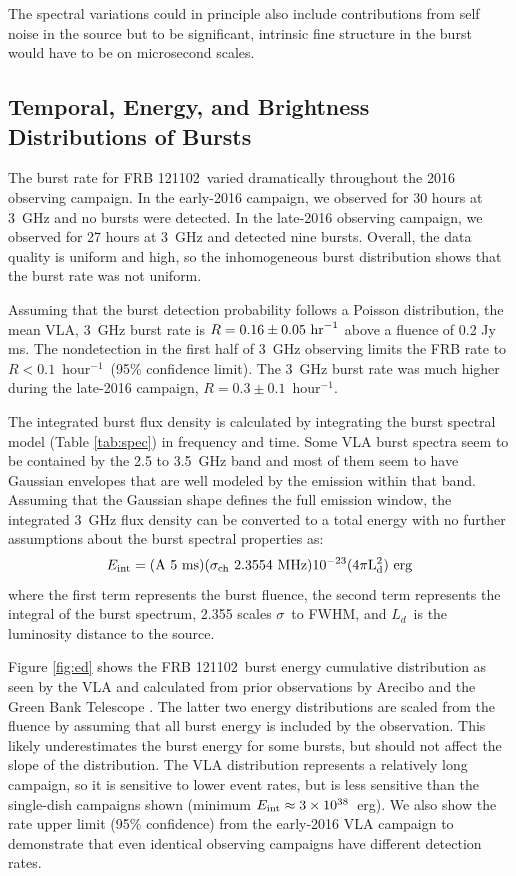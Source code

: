 \documentclass[twocolumn]{aastex61}
\newcommand{\frb}{FRB 121102}
\begin{document}
The spectral variations could in principle also include contributions from self noise in the source but to be significant, intrinsic fine structure in the burst would have to be on microsecond scales.  

\subsection{Temporal, Energy, and Brightness Distributions of Bursts}
\label{sec:disn}

The burst rate for \frb\ varied dramatically throughout the 2016 observing campaign. In the early-2016 campaign, we observed for 30 hours at 3~GHz and no bursts were detected. In the late-2016 observing campaign, we observed for 27 hours at 3~GHz and detected nine bursts. Overall, the data quality is uniform and high, so the inhomogeneous burst distribution shows that the burst rate was not uniform.

Assuming that the burst detection probability follows a Poisson distribution, the mean VLA, 3~GHz burst rate is $R=0.16\pm0.05\ \rm{hr}^{-1}$ above a fluence of 0.2 Jy ms. The nondetection in the first half of 3~GHz observing limits the FRB rate to $R<0.1$\ hour$^{-1}$\ (95\% confidence limit). The 3~GHz burst rate was much higher during the late-2016 campaign, $R=0.3\pm0.1$\ hour$^{-1}$.

The integrated burst flux density is calculated by integrating the burst spectral model (Table \ref{tab:spec}) in frequency and time. Some VLA burst spectra seem to be contained by the 2.5 to 3.5~GHz band and most of them seem to have Gaussian envelopes that are well modeled by the emission within that band. Assuming that the Gaussian shape defines the full emission window, the integrated 3~GHz flux density can be converted to a total energy with no further assumptions about the burst spectral properties as:
\begin{equation}
E_{\rm{int}} = (\rm{A}\ 5\ \rm{ms}) ( \sigma_{ch}\ 2.355 4\ \rm{MHz}) 10^{-23} (4\pi L_d^2)\ \rm{erg}
\end{equation}
\noindent where the first term represents the burst fluence, the second term represents the integral of the burst spectrum, 2.355 scales $\sigma$\ to FWHM, and $L_d$\ is the luminosity distance to the source.

Figure \ref{fig:ed} shows the \frb\ burst energy cumulative distribution as seen by the VLA and calculated from prior observations by Arecibo and the Green Bank Telescope \citep{2016Natur.531..202S,2016arXiv160308880S}. The latter two energy distributions are scaled from the fluence by assuming that all burst energy is included by the observation. This likely underestimates the burst energy for some bursts, but should not affect the slope of the distribution. The VLA distribution represents a relatively long campaign, so it is sensitive to lower event rates, but is less sensitive than the single-dish campaigns shown (minimum $E_{\rm{int}}\approx3\times10^{38}$\ erg). We also show the rate upper limit (95\% confidence) from the early-2016 VLA campaign to demonstrate that even identical observing campaigns have different detection rates.
\end{document}
